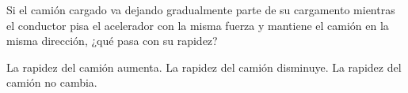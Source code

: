 \begin{multicols}{2}
\begin{parts}
        Si el camión cargado va dejando gradualmente parte de su cargamento mientras el
        conductor pisa el acelerador con la misma fuerza y mantiene el camión en la misma dirección,
        ¿qué pasa con su rapidez?

        \begin{choices}
            \choice La rapidez del cami\'on aumenta.
            \choice La rapidez del cami\'on disminuye.
            \choice La rapidez del cami\'on no cambia.
        \end{choices}







\end{parts}
\end{multicols}
